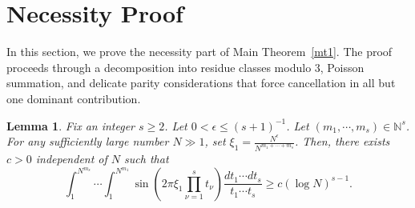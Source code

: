 \documentclass[11 pt,letterpaper]{amsart}
\theoremstyle{plain}
\newtheorem{lemma}{Lemma}\numberwithin{lemma}{section}
\theoremstyle{definition}
\theoremstyle{remark} \theoremstyle{exam} \theoremstyle{ob}
\numberwithin{equation}{section}
\begin{document}
\section{Necessity Proof}\label{sec10}
In this section, we prove the necessity part of Main Theorem~\ref{mt1}. The proof proceeds through a decomposition into residue classes modulo $3$, Poisson summation, and delicate parity considerations that force cancellation in all but one dominant contribution.
\begin{lemma}\label{propnec}
Fix an integer $s\geq2$. Let  $0<\epsilon\le (s+1)^{-1}$. Let $(m_1,\cdots,m_s)\in \mathbb{N}^{s}$. For any sufficiently large number $N\gg1$, set $\xi_1=\frac{N^{\epsilon}}{N^{m_1+\cdots+m_s}}$. Then, there exists $c>0$ independent of $N$ such that
$$ \int_{1}^{N^{m_s}}  \cdots \int_{1}^{N^{m_1}}  \sin\left(2\pi \xi_1 \prod_{\nu=1}^s t_\nu \right) \frac{dt_1\cdots dt_s}{t_1\cdots t_s} \ge c(\log N)^{s-1}.$$
\end{lemma}
\end{document}
